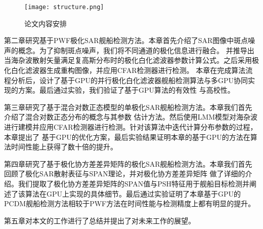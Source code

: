   \begin{figure}[H] %
    \centering
    \texttt{[image: structure.png]}
    \caption{论文内容安排}
    \label{fig:chap1:structure}
  \end{figure}

  第二章研究基于PWF极化SAR舰船检测方法。本章首先介绍了SAR图像中斑点噪声的概念。为了抑制斑点噪声，我们将不同通道的极化信息进行融合。
  并推导出当海杂波散射矢量满足复高斯分布时的极化白化滤波器参数计算公式。之后采用极化白化滤波器生成重构图像，并应用CFAR检测器进行检测。
  本章在完成算法流程分析后，设计了基于GPU的并行极化白化滤波器舰船检测算法与多GPU协同实现的方案。最后通过实验，我们验证了基于GPU算法的有效性
  与高校性。

  第三章研究了基于混合对数正态模型的单极化SAR舰船检测方法。本章我们首先介绍了混合对数正态分布的概念与其参数
  估计方法。然后使用LMM模型对海杂波进行建模并应用CFAR检测器进行检测。针对该算法中迭代计算分布参数的过程，本章提出了
  基于GPU的优化方案，最后实验结果证明本章的基于GPU的方法在算法时间性能上获得了数十倍的提升。

  第四章研究了基于极化协方差差异矩阵的极化SAR舰船检测方法。本章我们首先回顾了极化SAR散射表征与SPAN理论，并对极化协方差差异矩阵
  做了详细的介绍。我们提取了极化协方差差异矩阵的SPAN值与PSH特征用于舰船目标检测并阐述了该算法在GPU上实现的具体细节。最后通过实验证明了本章基于GPU的
  PCDM舰船检测方法相较于PWF方法在时间性能与检测精度上都有明显的提升。

  第五章对本文的工作进行了总结并提出了对未来工作的展望。
